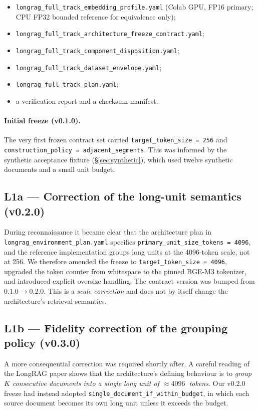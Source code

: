 \documentclass[11pt,a4paper]{article}
\begin{document}
\begin{itemize}[leftmargin=1.5em,itemsep=0.15em]
  \item \texttt{longrag\_full\_track\_embedding\_profile.yaml}
    (Colab GPU, FP16 primary; CPU FP32 bounded reference for
    equivalence only);
  \item \texttt{longrag\_full\_track\_architecture\_freeze\_contract.yaml};
  \item \texttt{longrag\_full\_track\_component\_disposition.yaml};
  \item \texttt{longrag\_full\_track\_dataset\_envelope.yaml};
  \item \texttt{longrag\_full\_track\_plan.yaml};
  \item a verification report and a checksum manifest.
\end{itemize}

\paragraph{Initial freeze (v0.1.0).}
The very first frozen contract set carried
\texttt{target\_token\_size = 256} and \texttt{construction\_policy =
adjacent\_segments}. This was informed by the synthetic acceptance
fixture (\S\ref{sec:synthetic}), which used twelve synthetic
documents and a small unit budget.

\subsection{L1a --- Correction of the long-unit semantics (v0.2.0)}
During reconnaissance it became clear that the architecture plan in
\texttt{longrag\_environment\_plan.yaml} specifies
\texttt{primary\_unit\_size\_tokens = 4096}, and the reference
implementation groups long units at the \SI{4096}{}-token scale, not
at \SI{256}{}. We therefore amended the freeze to
\texttt{target\_token\_size = 4096}, upgraded the token counter from
whitespace to the pinned BGE-M3 tokenizer, and introduced explicit
oversize handling. The contract version was bumped from
$0.1.0 \to 0.2.0$. This is a \emph{scale correction} and does not by
itself change the architecture's retrieval semantics.

\subsection{L1b --- Fidelity correction of the grouping policy (v0.3.0)}
\label{sec:fidelity-fix}

A more consequential correction was required shortly after. A careful
reading of the LongRAG paper shows that the architecture's defining
behaviour is to \emph{group $K$ consecutive documents into a single
long unit of $\approx \SI{4096}{}$ tokens}. Our v0.2.0 freeze had
instead adopted
\texttt{single\_document\_if\_within\_budget}, in which each source
document becomes its own long unit unless it exceeds the budget.
\end{document}
